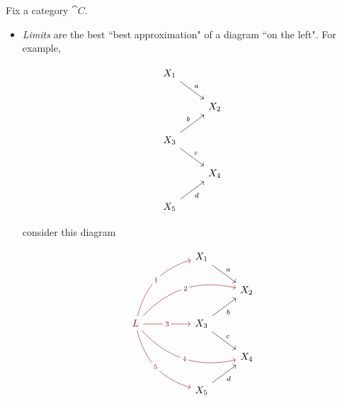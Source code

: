 \begin{attempt-definition}
Fix a category $\cat{C}$.
\begin{itemize}[leftmargin=*]
\item \emph{Limits} are the best ``best approximation" of a diagram ``on the left". For example,\\[0.5em]
\begin{minipage}{0.4\textwidth}
    \[\begin{tikzcd}
X_1 \arrow[rd,"a"]            &     \\
                          & X_2 \\
X_3 \arrow[ru,"b"] \arrow[rd,"c"] &     \\
                          & X_4 \\
X_5     \arrow[ru, "d"']                              &    
\end{tikzcd}\]
    \begin{center}
        consider this diagram
    \end{center}      
\end{minipage}
\begin{minipage}{0.6\textwidth}
\[\begin{tikzcd}
                                                                                                                                                                                                    &  & X_1 \arrow[rd, "a"]                  &                     \\
                                                                                                                                                                                                    &  &                                      & X_2                 \\
{\color{darkred}L} \arrow[rruu, "1" description, bend left, darkred] \arrow[rrru, "2" description, bend left, darkred] \arrow[rr, "3" description, darkred] \arrow[rrrd, "4" description, bend right, darkred] \arrow[rrdd, "5" description, bend right, darkred] &  & X_3 \arrow[ru, "b"'] \arrow[rd, "c"] &                     \\
                                                                                                                                                                                                    &  &                                      & X_4 \\
                                                                                                                                                                                                    &  & X_5 \arrow[ru, "d"']                                  &                    

\end{tikzcd}\]
\end{minipage}
\end{itemize}
\end{attempt-definition}
